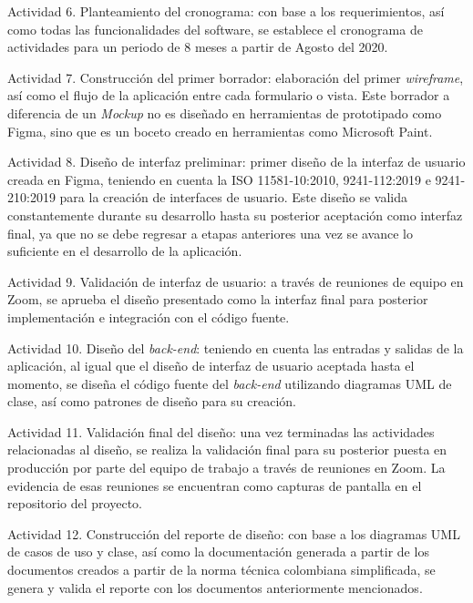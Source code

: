 \begin{APAitemize}
    \item Actividad 6. Planteamiento del cronograma: con base a los requerimientos, así como todas las funcionalidades del software, se establece el cronograma de actividades para un periodo de 8 meses a partir de Agosto del 2020.
    \item Actividad 7. Construcción del primer borrador: elaboración del primer \textit{wireframe}, así como el flujo de la aplicación entre cada formulario o vista. Este borrador a diferencia de un \textit{Mockup} no es diseñado en herramientas de prototipado como Figma, sino que es un boceto creado en herramientas como Microsoft Paint.
    \item Actividad 8. Diseño de interfaz preliminar: primer diseño de la interfaz de usuario creada en Figma, teniendo en cuenta la ISO 11581-10:2010, 9241-112:2019 e 9241-210:2019 para la creación de interfaces de usuario. Este diseño se valida constantemente durante su desarrollo hasta su posterior aceptación como interfaz final, ya que no se debe regresar a etapas anteriores una vez se avance lo suficiente en el desarrollo de la aplicación.
    \item Actividad 9. Validación de interfaz de usuario: a través de reuniones de equipo en Zoom, se aprueba el diseño presentado como la interfaz final para posterior implementación e integración con el código fuente.
    \item Actividad 10. Diseño del \textit{back-end}: teniendo en cuenta las entradas y salidas de la aplicación, al igual que el diseño de interfaz de usuario aceptada hasta el momento, se diseña el código fuente del \textit{back-end} utilizando diagramas UML de clase, así como patrones de diseño para su creación.
    \item Actividad 11. Validación final del diseño: una vez terminadas las actividades relacionadas al diseño, se realiza la validación final para su posterior puesta en producción por parte del equipo de trabajo a través de reuniones en Zoom. La evidencia de esas reuniones se encuentran como capturas de pantalla en el repositorio del proyecto.
    \item Actividad 12. Construcción del reporte de diseño: con base a los diagramas UML de casos de uso y clase, así como la documentación generada a partir de los documentos creados a partir de la norma técnica colombiana simplificada, se genera y valida el reporte con los documentos anteriormente mencionados.
\end{APAitemize}

